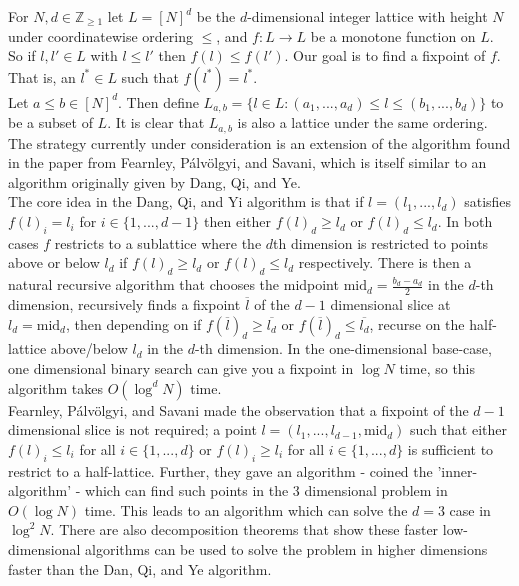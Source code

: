 \documentclass{article}
\newcommand{\Z}{\mathbb{Z}}
\newcommand{\mi}{\text{mid}}
\newcommand{\pav}{Pálvölgyi}
\begin{document}
    For $N, d \in \Z_{\geq 1}$ let  $L = [N]^d$ be the $d$-dimensional integer lattice with height $N$ under coordinatewise ordering $\leq$, and $f: L \to L$ be
   a monotone function on $L$. So if $l, l' \in L$ with $l \leq l'$ then $f(l) \leq f(l')$. 
   Our goal is to find a fixpoint of $f$. That is, an $l^* \in L$ such that $f(l^*) = l^*$.\\

  Let $a \leq b \in [N]^d$. Then define $L_{a, b} = \{ l \in L : (a_1, ..., a_d) \leq l \leq (b_1, ..., b_d) \}$ 
  to be a subset of $L$.
  It is clear that $L_{a, b}$ is also a lattice under the same ordering. \\

  The strategy currently under consideration is an extension of the algorithm found in
  the paper from Fearnley, Pálvölgyi, and Savani\cite{FePaSa}, which is itself similar
  to an algorithm originally given by Dang, Qi, and Ye\cite{DangQiYe}. \\

  The core idea
  in the Dang, Qi, and Yi algorithm is that if $l = (l_1, ..., l_d)$ satisfies
  $f(l)_i = l_i$ for $i \in \{1, ..., d-1\}$ then either $f(l)_d \geq l_d$ or $f(l)_d \leq l_d$.
  In both cases $f$ restricts to a sublattice where the $d$th dimension is restricted to points
  above or below $l_d$ if $f(l)_d \geq l_d$ or $f(l)_d \leq l_d$ respectively. There
  is then a natural recursive algorithm that chooses the midpoint $\mi_d = \frac{b_d - a_d}{2}$ in the $d$-th dimension,
  recursively finds a fixpoint $\overline{l}$ of the $d-1$ dimensional slice at $l_d = \mi_d$, then 
  depending on if $f(\overline{l})_d \geq \overline{l_d}$ or $f(\overline{l})_d \leq \overline{l_d}$,
  recurse on the half-lattice above/below $l_d$ in the $d$-th dimension. In the one-dimensional base-case,
  one dimensional binary search can give you a fixpoint in $\log N$ time, so this algorithm takes
  $O(\log^d N)$ time.\\

  
  Fearnley, \pav, and Savani made the observation that a fixpoint of the $d-1$ dimensional slice is not required; 
  a point $l = (l_1, ..., l_{d-1}, \mi_d)$ such that either $f(l)_i \leq l_i$ for all $i \in \{1, ..., d\}$ or 
  $f(l)_i \geq l_i$ for all $i \in \{1, ..., d\}$ is sufficient to restrict to a half-lattice. Further,
  they gave an algorithm - coined the 'inner-algorithm' - which can find
  such points in the 3 dimensional problem in $O(\log N)$ time. This leads to an algorithm which
  can solve the $d=3$ case in $\log^2 N$. There are also decomposition theorems that show these faster
  low-dimensional algorithms can be used to solve the problem in higher dimensions faster than
  the Dan, Qi, and Ye algorithm. \\
\end{document}
